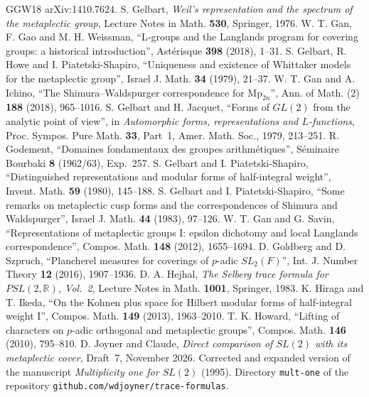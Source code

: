 \documentclass[12pt,letterpaper,openany]{book}
\numberwithin{equation}{chapter}
\theoremstyle{plain}
\theoremstyle{definition}
\theoremstyle{remark}
\theoremstyle{plain}
\begin{document}
\begin{thebibliography}{GGW18}
arXiv:1410.7624.
 S. Gelbart, \emph{Weil's representation and the spectrum of
the metaplectic group}, Lecture Notes in Math. \textbf{530}, Springer, 1976.
 W. T. Gan, F. Gao and M. H. Weissman, ``L-groups and the
Langlands program for covering groups: a historical introduction'',
Ast\'erisque \textbf{398} (2018), 1--31.
 S. Gelbart, R. Howe and I. Piatetski-Shapiro,
``Uniqueness and existence of Whittaker models for the metaplectic
group'', Israel J. Math. \textbf{34} (1979), 21--37.
 W. T. Gan and A. Ichino, ``The Shimura--Waldspurger
correspondence for $\mathrm{Mp}_{2n}$'', Ann. of Math. (2) \textbf{188}
(2018), 965--1016.
 S. Gelbart and H. Jacquet, ``Forms of $GL(2)$ from the
analytic point of view'', in \emph{Automorphic forms, representations and
$L$-functions}, Proc. Sympos. Pure Math. \textbf{33}, Part~1, Amer. Math.
Soc., 1979, 213--251.
 R. Godement, ``Domaines fondamentaux des groupes
arithm\'etiques'', S\'eminaire Bourbaki \textbf{8} (1962/63), Exp.~257.
 S. Gelbart and I. Piatetski-Shapiro, ``Distinguished
representations and modular forms of half-integral weight'', Invent.
Math. \textbf{59} (1980), 145--188.
 S. Gelbart and I. Piatetski-Shapiro, ``Some remarks on
metaplectic cusp forms and the correspondences of Shimura and
Waldspurger'', Israel J. Math. \textbf{44} (1983), 97--126.
 W. T. Gan and G. Savin, ``Representations of
metaplectic groups I: epsilon dichotomy and local Langlands
correspondence'', Compos. Math. \textbf{148} (2012), 1655--1694.
 D. Goldberg and D. Szpruch, ``Plancherel measures for
coverings of $p$-adic $SL_2(F)$'', Int. J. Number Theory \textbf{12} (2016),
1907--1936.
 D. A. Hejhal, \emph{The Selberg trace formula for
$PSL(2,\mathbb{R})$, Vol.~2}, Lecture Notes in Math. \textbf{1001},
Springer, 1983.
 K. Hiraga and T. Ikeda, ``On the Kohnen plus space for
Hilbert modular forms of half-integral weight I'', Compos. Math.
\textbf{149} (2013), 1963--2010.
 T. K. Howard, ``Lifting of characters on $p$-adic
orthogonal and metaplectic groups'', Compos. Math. \textbf{146} (2010),
795--810.
 D. Joyner and Claude, \emph{Direct comparison of
$SL(2)$ with its metaplectic cover}, Draft~7, November 2026. Corrected
and expanded version of the manuscript \emph{Multiplicity one for
$SL(2)$} (1995). Directory \texttt{mult-one} of the repository
\texttt{github.com/wdjoyner/trace-formulas}.

\end{thebibliography}
\end{document}

